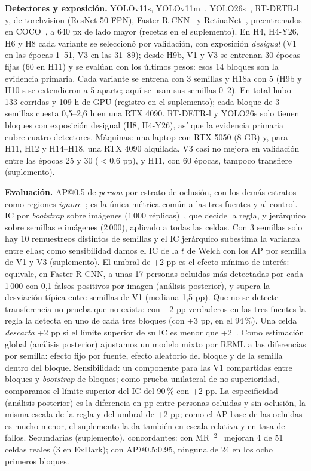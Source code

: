\documentclass[conference]{IEEEtran}
\begin{document}
\textbf{Detectores y exposición.} YOLOv11s, YOLOv11m~\cite{Ultralytics2024}, YOLO26s~\cite{Ultralytics2026yolo26}, RT-DETR-l~\cite{Zhao2024rtdetr} y, de torchvision (ResNet-50 FPN), Faster R-CNN~\cite{Ren2017faster} y RetinaNet~\cite{Lin2017focal}, preentrenados en COCO~\cite{Lin2014}, a 640 px de lado mayor (recetas en el suplemento). En H4, H4-Y26, H6 y H8 cada variante se seleccionó por validación, con exposición \emph{desigual} (V1 en las épocas 1--51, V3 en las 31--89); desde H9b, V1 y V3 se entrenan 30 épocas fijas (60 en H11) y se evalúan con los últimos pesos: esos 14 bloques son la evidencia primaria. Cada variante se entrena con 3 semillas y H18a con 5 (H9b y H10-s se extendieron a 5 aparte; aquí se usan sus semillas 0--2). En total hubo 133 corridas y 109 h de GPU (registro en el suplemento); cada bloque de 3 semillas cuesta 0,5--2,6 h en una RTX 4090. RT-DETR-l y YOLO26s solo tienen bloques con exposición desigual (H8, H4-Y26), así que la evidencia primaria cubre cuatro detectores. Máquinas: una laptop con RTX 5050 (8 GB) y, para H11, H12 y H14--H18, una RTX 4090 alquilada. V3 casi no mejora en validación entre las épocas 25 y 30 ($<$0,6 pp), y H11, con 60 épocas, tampoco transfiere (suplemento).

\textbf{Evaluación.} AP@0.5 de \emph{person} por estrato de oclusión, con los demás estratos como regiones \emph{ignore}~\cite{Zhang2017}; es la única métrica común a las tres fuentes y al control. IC por \emph{bootstrap} sobre imágenes (1\,000 réplicas)~\cite{Efron1993}, que decide la regla, y jerárquico sobre semillas e imágenes (2\,000), aplicado a todas las celdas. Con 3 semillas solo hay 10 remuestreos distintos de semillas y el IC jerárquico subestima la varianza entre ellas; como sensibilidad damos el IC de la $t$ de Welch con los AP por semilla de V1 y V3 (suplemento). El umbral de +2 pp es el efecto mínimo de interés: equivale, en Faster R-CNN, a unas 17 personas ocluidas más detectadas por cada 1\,000 con 0,1 falsos positivos por imagen (análisis posterior), y supera la desviación típica entre semillas de V1 (mediana 1,5 pp). Que no se detecte transferencia no prueba que no exista: con +2 pp verdaderos en las tres fuentes la regla la detecta en uno de cada tres bloques (con +3 pp, en el 94\,\%). Una celda \emph{descarta} +2 pp si el límite superior de su IC es menor que +2~\cite{Lakens2017tost}. Como estimación global (análisis posterior) ajustamos un modelo mixto por REML a las diferencias por semilla: efecto fijo por fuente, efecto aleatorio del bloque y de la semilla dentro del bloque. Sensibilidad: un componente para las V1 compartidas entre bloques y \emph{bootstrap} de bloques; como prueba unilateral de no superioridad, comparamos el límite superior del IC del 90\,\% con +2 pp. La especificidad (análisis posterior) es la diferencia en pp entre personas ocluidas y sin oclusión, la misma escala de la regla y del umbral de +2 pp; como el AP base de las ocluidas es mucho menor, el suplemento la da también en escala relativa y en tasa de fallos. Secundarias (suplemento), concordantes: con MR$^{-2}$~\cite{Dollar2012} mejoran 4 de 51 celdas reales (3 en ExDark); con AP@0.5:0.95, ninguna de 24 en los ocho primeros bloques.
\end{document}
